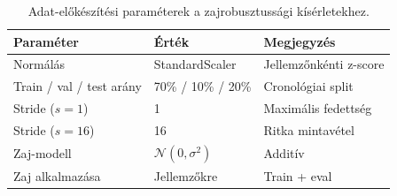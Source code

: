 \begin{table}[H]
    \centering
    \begin{tabular}{|l|l|l|}
        \hline
        \textbf{Paraméter} & \textbf{Érték} & \textbf{Megjegyzés} \\
        \hline\hline
        Normálás                  & StandardScaler   & Jellemzőnkénti z-score \\
        Train / val / test arány  & 70\% / 10\% / 20\% & Cronológiai split \\
        Stride ($s=1$)            & 1               & Maximális fedettség \\
        Stride ($s=16$)           & 16              & Ritka mintavétel \\
        Zaj-modell                & $\mathcal{N}(0, \sigma^2)$ & Additív \\
        Zaj alkalmazása           & Jellemzőkre      & Train + eval \\
        \hline
    \end{tabular}
    \caption{Adat-előkészítési paraméterek a zajrobusztussági kísérletekhez.}
    \label{tab:app_data}
\end{table}
